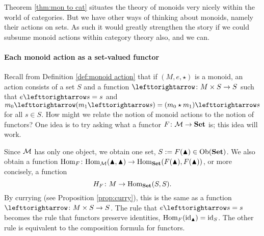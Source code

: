 Theorem \ref{thm:mon to cat} situates the theory of monoids very nicely within the world of categories. But we have other ways of thinking about monoids, namely their actions on sets. As such it would greatly strengthen the story if we could subsume monoid actions within category theory also, and we can.

\paragraph{Each monoid action as a set-valued functor}

Recall from Definition \ref{def:monoid action} that if $(M,e,\star)$ is a monoid, an action consists of a set $S$ and a function $\acts\taking M\times S\to S$ such that $e\acts s=s$ and $m_0\acts (m_1\acts s)=(m_0\star m_1)\acts s$ for all $s\in S$. How might we relate the notion of monoid actions to the notion of functors? One idea is to try asking what a functor $F\colon\mathcal{M}\rightarrow{\bf Set}$ is; this idea will work.

Since $\mathcal{M}$ has only one object, we obtain one set, $S:=F(\blacktriangle)\in\textnormal{Ob}({\bf Set})$. We also obtain a function $\textnormal{Hom}_F\colon\textnormal{Hom}_\mathcal{M}(\blacktriangle,\blacktriangle)\rightarrow\textnormal{Hom}_{\bf Set}(F(\blacktriangle),F(\blacktriangle))$, or more concisely, a function $$H_F\colon M\rightarrow\textnormal{Hom}_{\bf Set}(S,S).$$ By currying (see Proposition \ref{prop:curry}), this is the same as a function $\acts\taking M\times S\to S$. The rule that $e\acts s=s$ becomes the rule that functors preserve identities, $\textnormal{Hom}_F(\textnormal{id}_\blacktriangle)=\textnormal{id}_S$. The other rule is equivalent to the composition formula for functors. 


